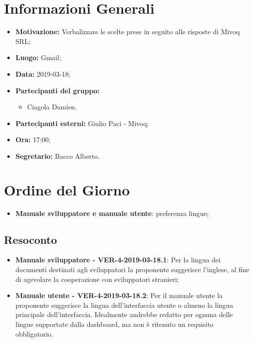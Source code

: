 \documentclass[a4paper, oneside, openany, dvipsnames, table]{article}
\begin{document}
\copertina{}


\newpage
\tableofcontents
\newpage
\section{Informazioni Generali}
\begin{itemize}
\item \textbf{Motivazione:} Verbalizzare le scelte prese in seguito alle risposte di Mivoq SRL;
\item \textbf{Luogo:} Gmail;
\item \textbf{Data:} 2019-03-18;
\item \textbf{Partecipanti del gruppo:} \hfill
	\begin{itemize}
	\item Ciagola Damien.
	\end{itemize} 
\item \textbf{Partecipanti esterni:} Giulio Paci - Mivoq;
\item \textbf{Ora:} 17:00;
\item \textbf{Segretario:} Bacco Alberto.
\end{itemize}

\section{Ordine del Giorno}
\begin{itemize}
	\item \textbf{Manuale sviluppatore e manuale utente}: preferenza lingue;
\end{itemize}

\subsection{Resoconto}
\begin{itemize}
	\item \textbf{Manuale sviluppatore - VER-4-2019-03-18.1}: 
	Per la lingua dei documenti destinati agli sviluppatori 
	la proponente suggerisce l'inglese, al fine di agevolare la cooperazione 
	con sviluppatori stranieri;
	\item \textbf{Manuale utente - VER-4-2019-03-18.2}:
	Per il manuale utente la proponente suggerisce la lingua dell'interfaccia 
	utente o almeno la lingua principale dell'interfaccia.
	Idealmente andrebbe redatto per ognuna delle lingue supportate 
	dalla dashboard, ma non è ritenuto un requisito obbligatorio.
	
	
\end{itemize}
\end{document}
